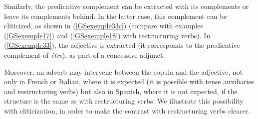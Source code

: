 \documentclass[output=paper
                ,modfonts
                ,nonflat
	        ,collection
	        ,collectionchapter
	        ,collectiontoclongg
 	        ,biblatex
                ,babelshorthands
                ,newtxmath
                ,draftmode
                ,colorlinks, citecolor=brown
]{./langsci/langscibook}
\begin{document}
{\begin{exe}
\begin{xlist}
		\label{GSexemple32c} 
	\end{xlist}
\end{exe}

Similarly, the predicative complement can be extracted with its complements or leave its complements behind. In the latter case, this complement can be cliticized, as shown in (\ref{GSexemple33c}) (compare with examples (\ref{GSexemple17}) and (\ref{GSexemple18}) with restructuring verbs). In (\ref{GSexemple33}), the adjective is extracted (it corresponds to the predicative complement of \textit{\^etre}), as part of a concessive adjunct.


\begin{exe}
	\label{GSexemple33} 
	\begin{xlist}
        \label{GSexemple33a} 
		
        \label{GSexemple33b} 
		
		\label{GSexemple33c} 
	\end{xlist}
\end{exe}

Moreover, an adverb may intervene between the copula and the adjective, not only in French or Italian, where it is expected (it is possible with tense auxiliaries and restructuring verbs) but also in Spanish, where it is not expected, if the structure is the same as with restructuring verbs. We illustrate this possibility with cliticization, in order to make the contrast with restructuring verbs clearer.

}
\end{document}
